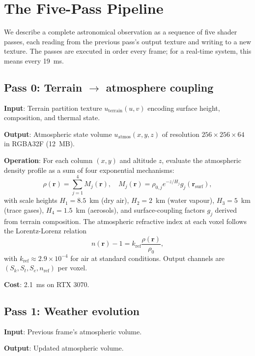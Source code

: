 \documentclass[11pt,twocolumn,a4paper]{article}
\theoremstyle{definition}
\theoremstyle{remark}
\newcommand{\Rvec}{\mathbf{r}}
\begin{document}
\section{The Five-Pass Pipeline}
\label{sec:pipeline}

We describe a complete astronomical observation as a sequence of five shader passes, each reading from the previous pass's output texture and writing to a new texture. The passes are executed in order every frame; for a real-time system, this means every 19~ms.

\subsection{Pass 0: Terrain $\to$ atmosphere coupling}

\textbf{Input}: Terrain partition texture $u_\text{terrain}(u,v)$ encoding surface height, composition, and thermal state.

\textbf{Output}: Atmospheric state volume $u_\text{atmos}(x,y,z)$ of resolution $256 \times 256 \times 64$ in RGBA32F (12~MB).

\textbf{Operation}: For each column $(x,y)$ and altitude $z$, evaluate the atmospheric density profile as a sum of four exponential mechanisms:
\begin{equation}
\rho(\Rvec) = \sum_{j=1}^4 M_j(\Rvec), \quad M_j(\Rvec) = \rho_{0,j} e^{-z/H_j} g_j(\Rvec_\text{surf}),
\end{equation}
with scale heights $H_1 = 8.5$~km (dry air), $H_2 = 2$~km (water vapour), $H_3 = 5$~km (trace gases), $H_4 = 1.5$~km (aerosols), and surface-coupling factors $g_j$ derived from terrain composition. The atmospheric refractive index at each voxel follows the Lorentz-Lorenz relation \citep{born1999}
\begin{equation}
n(\Rvec) - 1 = k_\text{ref} \frac{\rho(\Rvec)}{\rho_0},
\end{equation}
with $k_\text{ref} \approx 2.9 \times 10^{-4}$ for air at standard conditions. Output channels are $(S_k, S_t, S_e, n_\text{ref})$ per voxel.

\textbf{Cost}: 2.1~ms on RTX 3070.

\subsection{Pass 1: Weather evolution}

\textbf{Input}: Previous frame's atmospheric volume.

\textbf{Output}: Updated atmospheric volume.
\end{document}

